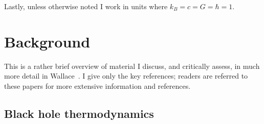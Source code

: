 \documentclass{article}
\begin{document}
Lastly, unless otherwise noted I work in units where $k_B=c=G=\hbar=1$.







\section{Background}\label{background}

This is a rather brief overview of material I discuss, and critically assess, in much more detail in Wallace~\citeyear{wallaceblackholethermodynamics,wallaceblackholestatmech}. I give only the key references; readers are referred to these papers for more extensive information and references.

\subsection{Black hole thermodynamics}\label{blackholethermodynamics}
\end{document}
